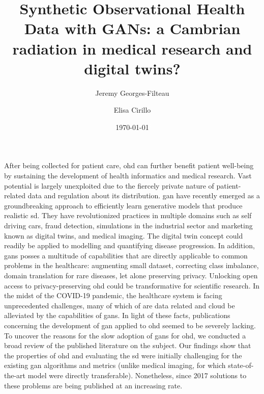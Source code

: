 \documentclass[6pt,acronym]{article}
\renewenvironment{abstract}
 {{\bfseries\noindent{\abstractname}\par\nobreak}\footnotesize}
 {\bigskip}
\begin{document}
    

    \title{Synthetic Observational Health Data with GANs: a Cambrian radiation in medical research and digital twins?}
    
    \author[1,2]{Jeremy Georges-Filteau}%
    \author[2]{Elisa Cirillo}%


    \vspace{-1em}

    \date{\today}

    \begingroup
    \let\center\flushleft
    \let\endcenter\endflushleft
    \maketitle
    \endgroup


    \glsresetall
    \begin{abstract}
    After being collected for patient care, \gls{ohd} can further benefit patient well-being by sustaining the development of health informatics and medical research. Vast potential is largely unexploited due to the fiercely private nature of patient-related data and regulation about its distribution. \gls{gan} have recently emerged as a groundbreaking approach to efficiently learn generative models that produce realistic \gls{sd}. They have revolutionized practices in multiple domains such as self driving cars, fraud detection, simulations in the industrial sector and marketing known as digital twins, and medical imaging. The digital twin concept could readily be applied to modelling and quantifying disease progression. In addition, \glspl{gan} posses a multitude of capabilities that are directly applicable to common problems in the healthcare: augmenting small dataset, correcting class imbalance, domain translation for rare diseases, let alone preserving privacy. Unlocking open access to privacy-preserving \gls{ohd} could be transformative for scientific research. In the midst of the COVID-19 pandemic, the healthcare system is facing unprecedented challenges, many of which of are data related and cloud be alleviated by the capabilities of \glspl{gan}. In light of these facts, publications concerning the development of  \gls{gan} applied to \gls{ohd} seemed to be severely lacking. To uncover the reasons for the slow adoption of \glspl{gan} for \gls{ohd}, we conducted a broad review of the published literature on the subject. Our findings show that the properties of \gls{ohd} and evaluating the \gls{sd} were initially challenging for the existing \gls{gan} algorithms and metrics (unlike medical imaging, for which state-of-the-art model were directly transferable). Nonetheless, since 2017 solutions to these problems are being published at an increasing rate.
    \end{abstract}

    
    
    
    
    
    

    \pagebreak

    \printglossary[type=oalgo]
    \printglossary[type=\acronymtype]

    \pagebreak

    
\end{document}
